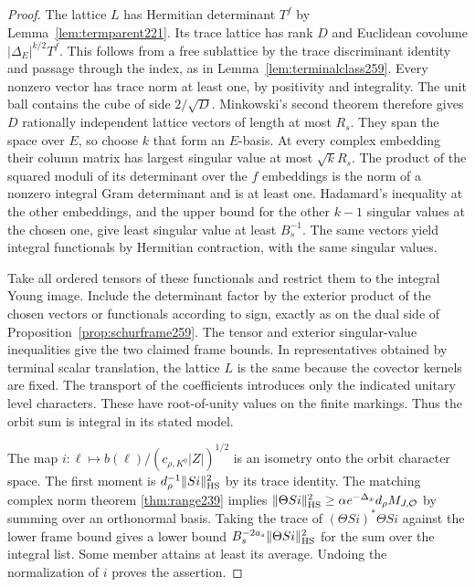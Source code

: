 \documentclass[a4paper,11pt]{article}
\theoremstyle{definition}
\theoremstyle{remark}
\numberwithin{equation}{section}
\begin{document}
\begin{proof}
The lattice \(L\) has Hermitian determinant \(T^f\) by
Lemma~\ref{lem:termparent221}. Its trace lattice has
rank \(D\) and Euclidean covolume
\(|\Delta_E|^{k/2}T^f\). This follows from a free sublattice
by the trace discriminant identity and passage through the
index, as in Lemma~\ref{lem:terminalclass259}. Every
nonzero vector has trace norm at least one, by positivity
and integrality. The unit ball contains the cube of side
\(2/\sqrt D\). Minkowski's second theorem therefore gives
\(D\) rationally independent lattice vectors of length at
most \(R_s\). They span the space over \(E\), so choose
\(k\) that form an \(E\)-basis. At every complex embedding
their column matrix has largest singular value at most
\(\sqrt{k}R_s\). The product of the squared moduli of its
determinant over the \(f\) embeddings is the norm of a
nonzero integral Gram determinant and is at least one.
Hadamard's inequality at the other embeddings, and the
upper bound for the other \(k-1\) singular values at the
chosen one, give least singular value at least \(B_s^{-1}\).
The same vectors yield integral functionals by Hermitian
contraction, with the same singular values.

Take all ordered tensors of these functionals and restrict
them to the integral Young image. Include the determinant
factor by the exterior product of the chosen vectors or
functionals according to sign, exactly as on the dual side
of Proposition~\ref{prop:schurframe259}. The tensor and
exterior singular-value inequalities give the two claimed
frame bounds. In representatives obtained by terminal scalar
translation, the lattice \(L\) is the same because the
covector kernels are fixed. The transport of the coefficients
introduces only the indicated unitary level characters.
These have root-of-unity values on the finite markings.
Thus the orbit sum is integral in its stated model.

The map \(i:\ell\mapsto b(\ell)/(c_{\rho,K^0}|Z|)^{1/2}\)
is an isometry onto the orbit character space. The first
moment is \(d_\rho^{-1}\|S i\|_{\rm HS}^2\) by its trace
identity. The matching complex norm theorem
\ref{thm:range239} implies
\(\|\Theta S i\|_{\rm HS}^2\ge
\alpha e^{-\Delta_x}d_\rho M_{J,{\cal O}}\)
by summing over an orthonormal basis. Taking the trace
of \((\Theta S i)^*\Theta S i\) against the lower frame
bound gives a lower bound \(B_s^{-2a_s}\|\Theta S i\|_{\rm HS}^2\)
for the sum over the integral list. Some member attains
at least its average. Undoing the normalization of \(i\)
proves the assertion.
\end{proof}
\end{document}
